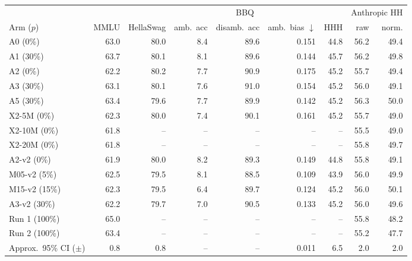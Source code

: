 \begin{tabular}{lrrrrrrrr}
\toprule
 & & & \multicolumn{3}{c}{BBQ} & & \multicolumn{2}{c}{Anthropic HH} \\
\cmidrule(lr){4-6}\cmidrule(lr){8-9}
Arm ($p$) & MMLU & HellaSwag & amb.\ acc & disamb.\ acc & amb.\ bias $\downarrow$ & HHH & raw & norm. \\
\midrule
A0 (0\%) & 63.0 & 80.0 & 8.4 & 89.6 & 0.151 & 44.8 & 56.2 & 49.4 \\
A1 (30\%) & 63.7 & 80.1 & 8.1 & 89.6 & 0.144 & 45.7 & 56.2 & 49.8 \\
A2 (0\%) & 62.2 & 80.2 & 7.7 & 90.9 & 0.175 & 45.2 & 55.7 & 49.4 \\
A3 (30\%) & 63.1 & 80.1 & 7.6 & 91.0 & 0.154 & 45.2 & 56.0 & 49.1 \\
A5 (30\%) & 63.4 & 79.6 & 7.7 & 89.9 & 0.142 & 45.2 & 56.3 & 50.0 \\
\midrule
X2-5M (0\%) & 62.3 & 80.0 & 7.4 & 90.1 & 0.161 & 45.2 & 55.7 & 49.0 \\
X2-10M (0\%) & 61.8 & -- & -- & -- & -- & -- & 55.5 & 49.0 \\
X2-20M (0\%) & 61.8 & -- & -- & -- & -- & -- & 55.8 & 49.7 \\
\midrule
A2-v2 (0\%) & 61.9 & 80.0 & 8.2 & 89.3 & 0.149 & 44.8 & 55.8 & 49.1 \\
M05-v2 (5\%) & 62.5 & 79.5 & 8.1 & 88.5 & 0.109 & 43.9 & 56.0 & 49.9 \\
M15-v2 (15\%) & 62.3 & 79.5 & 6.4 & 89.7 & 0.124 & 45.2 & 56.0 & 50.1 \\
A3-v2 (30\%) & 62.2 & 79.7 & 7.0 & 90.5 & 0.133 & 45.2 & 56.0 & 49.6 \\
\midrule
Run 1 (100\%) & 65.0 & -- & -- & -- & -- & -- & 55.8 & 48.2 \\
Run 2 (100\%) & 63.4 & -- & -- & -- & -- & -- & 55.2 & 47.7 \\
\midrule
Approx.\ 95\% CI ($\pm$) & 0.8 & 0.8 & -- & -- & 0.011 & 6.5 & 2.0 & 2.0 \\
\bottomrule
\end{tabular}
